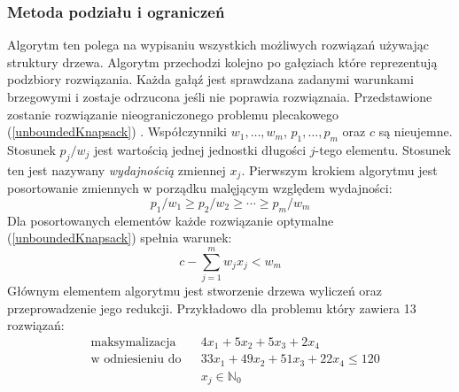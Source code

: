 \subsubsection{Metoda podziału i ograniczeń}
Algorytm ten polega na wypisaniu wszystkich możliwych rozwiązań używając struktury drzewa. Algorytm przechodzi kolejno po gałęziach które reprezentują podzbiory rozwiązania. Każda gałąź jest sprawdzana zadanymi warunkami brzegowymi i zostaje odrzucona jeśli nie poprawia rozwiąznaia. Przedstawione zostanie rozwiązanie nieograniczonego problemu plecakowego (\cref{unboundedKnapsack}) \cite{ChvatalBook}. Współczynniki $w_1,\dots,w_m$, $p_1, \dots, p_m$ oraz $c$ są nieujemne. Stosunek $p_j/w_j$ jest wartością jednej jednostki długości $j$-tego elementu. Stosunek ten jest nazywany \textit{wydajnością} zmiennej $x_j$. Pierwszym krokiem algorytmu jest posortowanie zmiennych w porządku malęjącym względem wydajności:
\begin{equation} \label{eq:BBeff}
  p_1/w_1 \ge p_2/w_2 \ge \cdots \ge p_m/w_m
\end{equation}
Dla posortowanych elementów każde rozwiązanie optymalne (\cref{unboundedKnapsack}) spełnia warunek:
\begin{equation}
  c - \sum_{j=1}^m w_jx_j < w_m
\end{equation}
Głównym elementem algorytmu jest stworzenie drzewa wyliczeń oraz przeprowadzenie jego redukcji. Przykładowo dla problemu który zawiera 13 rozwiązań:
\begin{equation*}
  \begin{aligned}
    & \textrm{maksymalizacja} & &  4x_1 + 5x_2 + 5x_3 + 2x_4\\
    & \textrm{w odniesieniu do} & & 33x_1 + 49x_2 + 51x_3+22x_4 \le 120\\
    &&& x_j \in \mathbb{N}_0
  \end{aligned}
\end{equation*}

